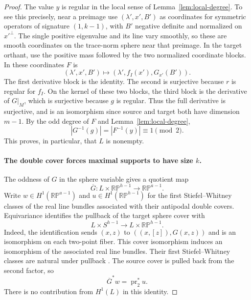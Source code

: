 \begin{proof}
The value $y$ is regular in the local sense of
Lemma~\ref{lem:local-degree}.  To see this precisely, near a
preimage use $(\lambda',x',B')$ as coordinates for symmetric
operators of signature $(1,k-1)$, with $B'$ negative definite and
normalized on $x'^\perp$.  The single positive eigenvalue and its
line vary smoothly, so these are smooth coordinates on the
trace-norm sphere near that preimage.  In the target orthant, use
the positive mass followed by the two normalized coordinate
blocks.  In these coordinates $F$ is
\begin{equation}\label{eq:triangular-derivative}
 (\lambda',x',B')\longmapsto
       (\lambda',f_I(x'),G_{x'}(B')).
\end{equation}
The first derivative block is the identity.  The second is
surjective because $r$ is regular for $f_I$.  On the kernel of
these two blocks, the third block is the derivative of
$G|_M$, which is surjective because $g$ is regular.  Thus the full
derivative is surjective, and is an isomorphism since source and
target both have dimension $m-1$.  By the odd degree of $F$ and
Lemma~\ref{lem:local-degree},
\begin{equation}\label{eq:bundle-odd-count}
 |G^{-1}(g)|=|F^{-1}(y)|\equiv1\pmod2.
\end{equation}
This proves, in particular, that $L$ is nonempty.

\paragraph{The double cover forces maximal supports to have size $k$.}
The oddness of $G$ in the sphere variable gives a quotient map
\[
 \overline G:L\times\mathbb{RP}^{h-1}
                  \longrightarrow\mathbb{RP}^{a-1}.
\]
Write $w\in H^1(\mathbb{RP}^{a-1})$ and
$u\in H^1(\mathbb{RP}^{h-1})$ for the first Stiefel--Whitney classes
of the real line bundles associated with their antipodal double covers.
Equivariance identifies the pullback of the target
sphere cover with
\[
 L\times S^{h-1}\longrightarrow L\times\mathbb{RP}^{h-1}.
\]
Indeed, the identification sends $(x,z)$ to
$((x,[z]),G(x,z))$ and is an isomorphism on each two-point fiber.
This cover isomorphism induces an isomorphism of the associated real
line bundles. Their first Stiefel--Whitney classes are natural under
pullback \cite[Theorem~3.1(a)]{HatcherVB2017}.
The source cover is pulled back from the second factor, so
\begin{equation}\label{eq:cover-class}
 \overline G^*w=\operatorname{pr}_2^*u.
\end{equation}
There is no contribution from $H^1(L)$ in this identity.


\end{proof}
